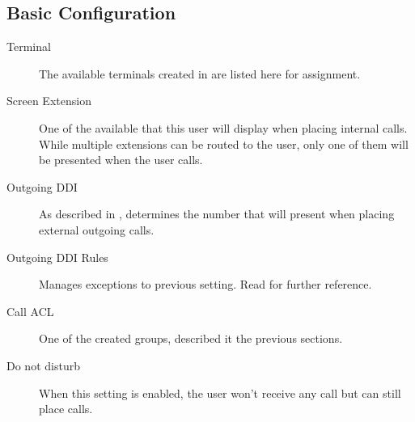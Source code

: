 \documentclass[letterpaper,10pt,english]{sphinxmanual}
\begin{document}
\subsection{Basic Configuration}
\label{company/users:basic-configuration}
\noindent{}
\begin{description}
\item[{Terminal}] \leavevmode{}\label{company/users:term-terminal}
The available terminals created in {\hyperref[company/terminals:terminals]{}} are listed here
for assignment.

\item[{Screen Extension}] \leavevmode{}\label{company/users:term-screen-extension}
One of the available {\hyperref[company/extensions:extensions]{}} that this user will display when
placing internal calls. While multiple extensions can be routed to the
user, only one of them will be presented when the user calls.

\item[{Outgoing DDI}] \leavevmode{}\label{company/users:term-outgoing-ddi}
As described in {\hyperref[getting_started/external_outgoing_calls/outgoing_ddi:external\string-ddi]{}}, determines the number that will
present when placing external outgoing calls.

\item[{Outgoing DDI Rules}] \leavevmode{}\label{company/users:term-outgoing-ddi-rules}
Manages exceptions to previous setting. Read {\hyperref[company/outgoingddi_rules:outgoingddi\string-rules]{}}
for further reference.

\item[{Call ACL}] \leavevmode{}\label{company/users:term-call-acl}
One of the created {\hyperref[company/call_permissions:call\string-permissions]{}} groups, described
it the previous sections.

\item[{Do not disturb}] \leavevmode{}\label{company/users:term-do-not-disturb}
When this setting is enabled, the user won't receive any call but can
still place calls.


\end{description}
\end{document}
